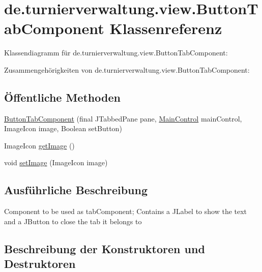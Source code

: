 \hypertarget{classde_1_1turnierverwaltung_1_1view_1_1_button_tab_component}{}\section{de.\+turnierverwaltung.\+view.\+Button\+Tab\+Component Klassenreferenz}
\label{classde_1_1turnierverwaltung_1_1view_1_1_button_tab_component}


Klassendiagramm für de.\+turnierverwaltung.\+view.\+Button\+Tab\+Component\+:


Zusammengehörigkeiten von de.\+turnierverwaltung.\+view.\+Button\+Tab\+Component\+:
\subsection*{Öffentliche Methoden}
\begin{DoxyCompactItemize}
\item 
\hyperlink{classde_1_1turnierverwaltung_1_1view_1_1_button_tab_component_a702cc3e08327e724aac9dc3af8d1ba64}{Button\+Tab\+Component} (final J\+Tabbed\+Pane pane, \hyperlink{classde_1_1turnierverwaltung_1_1control_1_1_main_control}{Main\+Control} main\+Control, Image\+Icon image, Boolean set\+Button)
\item 
Image\+Icon \hyperlink{classde_1_1turnierverwaltung_1_1view_1_1_button_tab_component_a04f6a893ddb81026461b3fe65c6e5fbf}{get\+Image} ()
\item 
void \hyperlink{classde_1_1turnierverwaltung_1_1view_1_1_button_tab_component_a35ab872d58eb0d6c571aabc62cf4ff10}{set\+Image} (Image\+Icon image)
\end{DoxyCompactItemize}


\subsection{Ausführliche Beschreibung}
Component to be used as tab\+Component; Contains a J\+Label to show the text and a J\+Button to close the tab it belongs to 

\subsection{Beschreibung der Konstruktoren und Destruktoren}
